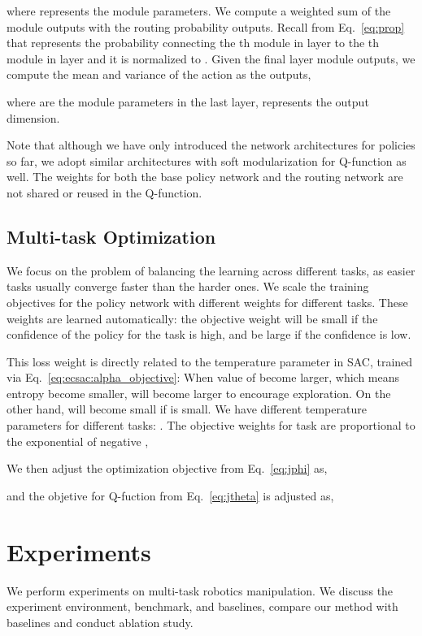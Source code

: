 \documentclass{article}
\begin{document}
where  represents the module parameters. We compute a weighted sum of the module outputs with the routing probability outputs. Recall from Eq.~\ref{eq:prop} that  represents the probability connecting the th module in layer  to the th module in layer  and it is normalized to . 
Given the final layer module outputs, we compute the mean and variance of the action as the outputs,
\vspace{-0.1in}

where  are the module parameters in the last layer,  represents the output dimension. 

Note that although we have only introduced the network architectures for policies so far, we adopt similar architectures with soft modularization for Q-function as well. The weights for both the base policy network and the routing network are not shared or reused in the Q-function. 


\vspace{-0.07in}
\subsection{Multi-task Optimization}
\vspace{-0.07in}

We focus on the problem of balancing the learning across different tasks, as easier tasks usually converge faster than the harder ones. We scale the training objectives for the policy network with different weights for different tasks. These weights are learned automatically: the objective weight will be small if the confidence of the policy for the task is high, and be large if the confidence is low. 

This loss weight is directly related to the temperature parameter  in SAC, trained via Eq.~\ref{eq:ecsac:alpha_objective}: When value of  become larger, which means entropy become smaller,  will become larger to encourage exploration. On the other hand,  will become small if  is small. We have different temperature parameters for  different tasks: . The objective weights  for task  are proportional to the exponential of negative ,
\vspace{-0.1in}

We then adjust the optimization objective from Eq.~\ref{eq:jphi} as,

and the objetive for Q-fuction from Eq.~\ref{eq:jtheta} is adjusted as,

 
\vspace{-0.1in}
\section{Experiments}\label{sec:expr}
\vspace{-0.1in}
We perform experiments on multi-task robotics manipulation. We discuss the experiment environment, benchmark, and baselines,  compare our method with baselines and conduct ablation study. 
\end{document}
